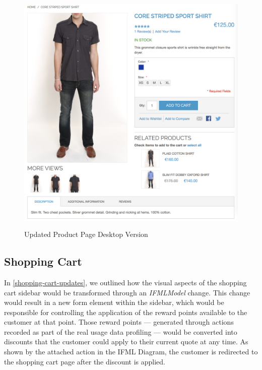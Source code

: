\begin{figure}[H]
  \centering
    \includegraphics[height=12cm]{images/diagrams/after/desktop-product.png}
  \caption{Updated Product Page Desktop Version}
  \label{fig:desktop-after-product}
\end{figure}
\vspace{0.5cm}

\newpage
\subsection{Shopping Cart}

In \ref{shopping-cart-updates}, we outlined how the visual aspects of the shopping cart sidebar would be transformed through an \textit{IFMLModel} change. This change would result in a new form element within the sidebar, which would be responsible for controlling the application of the reward points available to the customer at that point. Those reward points --- generated through actions recorded as part of the real usage data profiling --- would be converted into discounts that the customer could apply to their current quote at any time. As shown by the attached action in the IFML Diagram, the customer is redirected to the shopping cart page after the discount is applied.

